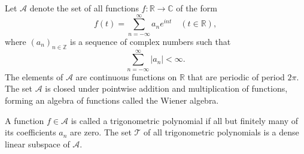 Let $\mathcal{A}$ denote the set of all functions $f: \mathbb{R} \to \mathbb{C}$ of the form
$$f(t) = \sum_{n=-\infty}^{\infty} a_n e^{int} \quad (t \in \mathbb{R}),$$
where $(a_n)_{n \in \mathbb{Z}}$ is a sequence of complex numbers such that
$$\sum_{n=-\infty}^{\infty} |a_n| < \infty.$$
The elements of $\mathcal{A}$ are continuous functions on $\mathbb{R}$ that are periodic of period $2\pi$. The set $\mathcal{A}$ is closed under pointwise addition and multiplication of functions, forming an algebra of functions called the Wiener algebra.

A function $f \in \mathcal{A}$ is called a trigonometric polynomial if all but finitely many of its coefficients $a_n$ are zero. The set $\mathcal{T}$ of all trigonometric polynomials is a dense linear subspace of $\mathcal{A}$.
